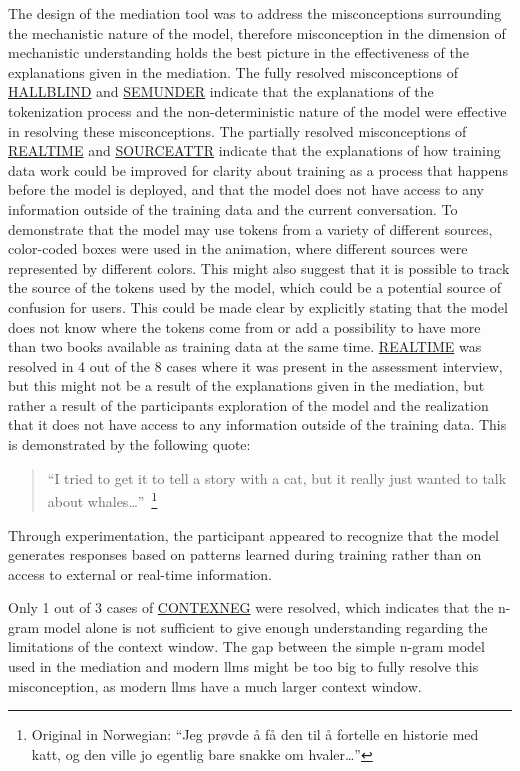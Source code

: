The design of the mediation tool was to address the misconceptions surrounding the mechanistic nature of the model, therefore misconception in the dimension of mechanistic understanding holds the best picture in the effectiveness of the explanations given in the mediation. The fully resolved misconceptions of \hyperref[hallblind]{HALLBLIND} and \hyperref[semunder]{SEMUNDER} indicate that the explanations of the tokenization process and the non-deterministic nature of the model were effective in resolving these misconceptions. 
The partially resolved misconceptions of \hyperref[realtime]{REALTIME} and \hyperref[sourceattr]{SOURCEATTR} indicate that the explanations of how training data work could be improved for clarity about training as a process that happens before the model is deployed, and that the model does not have access to any information outside of the training data and the current conversation. To demonstrate that the model may use tokens from a variety of different sources, color-coded boxes were used in the animation, where different sources were represented by different colors. This might also suggest that it is possible to track the source of the tokens used by the model, which could be a potential source of confusion for users. This could be made clear by explicitly stating that the model does not know where the tokens come from or add a possibility to have more than two books available as training data at the same time.
\hyperref[realtime]{REALTIME} was resolved in 4 out of the 8 cases where it was present in the assessment interview, but this might not be a result of the explanations given in the mediation, but rather a result of the participants exploration of the model and the realization that it does not have access to any information outside of the training data. This is demonstrated by the following quote:
\begin{quote}
``I tried to get it to tell a story with a cat, but it really just wanted to talk about whales\dots''~\footnote{Original in Norwegian: ``Jeg prøvde å få den til å fortelle en historie med katt, og den ville jo egentlig bare snakke om hvaler\dots''}
\end{quote}
Through experimentation, the participant appeared to recognize that the model generates responses based on patterns learned during training rather than on access to external or real-time information.

Only 1 out of 3 cases of \hyperref[contexneg]{CONTEXNEG} were resolved, which indicates that the n-gram model alone is not sufficient to give enough understanding regarding the limitations of the context window. The gap between the simple n-gram model used in the mediation and modern \gls{llms} might be too big to fully resolve this misconception, as modern \gls{llms} have a much larger context window.

